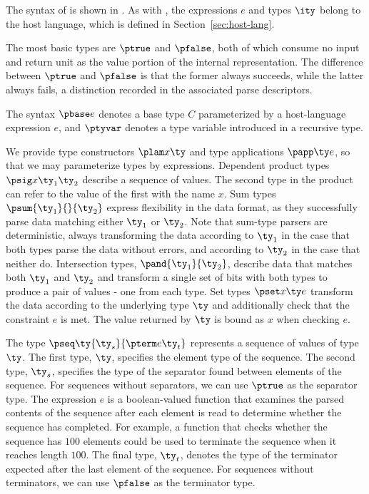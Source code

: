 The syntax of \ddc{} is shown in . As with
\ipads{}, the expressions $e$ and types $\ity$ belong to the host
language, which is defined in Section~\ref{sec:host-lang}.

The most basic types are $\ptrue$ and $\pfalse$, both of which consume
no input and return unit as the value portion of the internal
representation.  The difference between $\ptrue$ and $\pfalse$ is that
the former always succeeds, while the latter always fails, a
distinction recorded in the associated parse descriptors.

The syntax $\pbase e$ denotes a base type $C$ parameterized by a
host-language expression $e$, and $\ptyvar$ denotes a type variable
introduced in a recursive type.

We provide type constructors $\plam x {} \ty$ and type applications
$\papp \ty e$, so that we may parameterize types by expressions.
Dependent product types $\psig x {\ty_1} {\ty_2}$ describe a sequence
of values. The second type in the product can refer to the value of
the first with the name $x$. Sum types $\psum {\ty_1} {} {\ty_2}$
express flexibility in the data format, as they successfully parse
data matching either $\ty_1$ or $\ty_2$. Note that sum-type parsers
are deterministic, always transforming the data according to $\ty_1$
in the case that both types parse the data without errors, and
according to $\ty_2$ in the case that neither do. Intersection types,
$\pand {\ty_1} {\ty_2}$, describe data that matches both $\ty_1$ and
$\ty_2$ and transform a single set of bits with both types to produce
a pair of values - one from each type. Set types $\pset x \ty e$
transform the data according to the underlying type $\ty$ and
additionally check that the constraint $e$ is met.  The value returned
by $\ty$ is bound as $x$ when checking $e$.

The type $\pseq \ty {\ty_s} {\pterm e {\ty_t}}$ represents a sequence
of values of type $\ty$. The first type, $\ty$, specifies the element
type of the sequence. The second type, $\ty_s$, specifies the type of
the separator found between elements of the sequence. For sequences
without separators, we can use $\ptrue$ as the separator type.  The
expression $e$ is a boolean-valued function that examines the parsed
contents of the sequence after each element is read to determine
whether the sequence has completed. For example, a function that
checks whether the sequence has $100$ elements could be used to
terminate the sequence when it reaches length $100$.  The final type,
$\ty_t$, denotes the type of the terminator expected after the last
element of the sequence. For sequences without terminators, we can use
$\pfalse$ as the terminator type.

